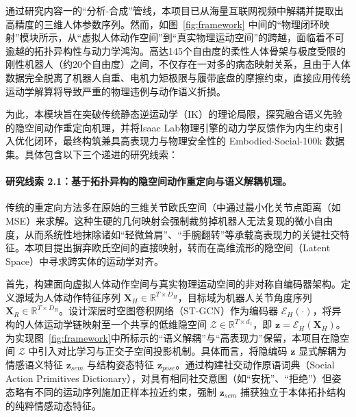 
通过研究内容一的“分析-合成”管线，本项目已从海量互联网视频中解耦并提取出高精度的三维人体参数序列。然而，如图~\ref{fig:framework} 中间的“物理闭环映射”模块所示，从“虚拟人体动作空间”到“真实物理运动空间”的跨越，面临着不可逾越的拓扑异构性与动力学鸿沟。高达145个自由度的柔性人体骨架与极度受限的刚性机器人（约20个自由度）之间，不仅存在一对多的病态映射关系，且由于人体数据完全脱离了机器人自重、电机力矩极限与履带底盘的摩擦约束，直接应用传统运动学解算将导致严重的物理违例与动作语义折损。

为此，本模块旨在突破传统静态逆运动学（IK）的理论局限，探究融合语义先验的隐空间动作重定向机理，并将Isaac Lab物理引擎的动力学反馈作为内生约束引入优化闭环，最终构筑兼具高表现力与物理安全性的 Embodied-Social-100k 数据集。具体包含以下三个递进的研究线索：

\paragraph{\textbf{研究线索 2.1：基于拓扑异构的隐空间动作重定向与语义解耦机理。}}

传统的重定向方法多在原始的三维关节欧氏空间（中通过最小化关节点距离（如MSE）来求解。这种生硬的几何映射会强制裁剪掉机器人无法复现的微小自由度，从而系统性地抹除诸如“轻微耸肩”、“手腕翻转”等承载高表现力的关键社交特征。本项目提出摒弃欧氏空间的直接映射，转而在高维流形的隐空间（Latent Space）中寻求跨实体的运动学对齐。

首先，构建面向虚拟人体动作空间与真实物理运动空间的非对称自编码器架构。定义源域为人体动作特征序列 $\mathbf{X}_H \in \mathbb{R}^{T \times D_H}$，目标域为机器人关节角度序列 $\mathbf{X}_R \in \mathbb{R}^{T \times D_R}$。设计深层时空图卷积网络（ST-GCN）作为编码器 $\mathcal{E}_H(\cdot)$，将异构的人体运动学链映射至一个共享的低维隐空间 $\mathcal{Z} \in \mathbb{R}^{T \times d_z}$，即 $\mathbf{z} = \mathcal{E}_H(\mathbf{X}_H)$。
为实现图~\ref{fig:framework}中所标示的“语义解耦”与“高表现力”保留，本项目在隐空间 $\mathcal{Z}$ 中引入对比学习与正交子空间投影机制。具体而言，将隐编码 $\mathbf{z}$ 显式解耦为情感语义特征 $\mathbf{z}_{sem}$ 与结构姿态特征 $\mathbf{z}_{pose}$。通过构建社交动作原语词典（Social Action Primitives Dictionary），对具有相同社交意图（如“安抚”、“拒绝”）但姿态略有不同的运动序列施加正样本拉近约束，强制 $\mathbf{z}_{sem}$ 捕获独立于本体拓扑结构的纯粹情感动态特征。


